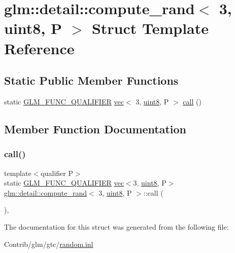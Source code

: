 \hypertarget{structglm_1_1detail_1_1compute__rand_3_013_00_01uint8_00_01_p_01_4}{}\section{glm\+:\+:detail\+:\+:compute\+\_\+rand$<$ 3, uint8, P $>$ Struct Template Reference}
\label{structglm_1_1detail_1_1compute__rand_3_013_00_01uint8_00_01_p_01_4}
\subsection*{Static Public Member Functions}
\begin{DoxyCompactItemize}
\item 
static \mbox{\hyperlink{setup_8hpp_a33fdea6f91c5f834105f7415e2a64407}{G\+L\+M\+\_\+\+F\+U\+N\+C\+\_\+\+Q\+U\+A\+L\+I\+F\+I\+ER}} \mbox{\hyperlink{structglm_1_1vec}{vec}}$<$ 3, \mbox{\hyperlink{namespaceglm_1_1detail_aef2588f97d090cc19fbbe0c74fe17c8f}{uint8}}, P $>$ \mbox{\hyperlink{structglm_1_1detail_1_1compute__rand_3_013_00_01uint8_00_01_p_01_4_a1c4fe17e05c4f573144b285f20675ec5}{call}} ()
\end{DoxyCompactItemize}


\subsection{Member Function Documentation}
\mbox{\label{structglm_1_1detail_1_1compute__rand_3_013_00_01uint8_00_01_p_01_4_a1c4fe17e05c4f573144b285f20675ec5}} 
\subsubsection{\texorpdfstring{call()}{call()}}
{\footnotesize\ttfamily template$<$qualifier P$>$ \\
static \mbox{\hyperlink{setup_8hpp_a33fdea6f91c5f834105f7415e2a64407}{G\+L\+M\+\_\+\+F\+U\+N\+C\+\_\+\+Q\+U\+A\+L\+I\+F\+I\+ER}} \mbox{\hyperlink{structglm_1_1vec}{vec}}$<$3, \mbox{\hyperlink{namespaceglm_1_1detail_aef2588f97d090cc19fbbe0c74fe17c8f}{uint8}}, P$>$ \mbox{\hyperlink{structglm_1_1detail_1_1compute__rand}{glm\+::detail\+::compute\+\_\+rand}}$<$ 3, \mbox{\hyperlink{namespaceglm_1_1detail_aef2588f97d090cc19fbbe0c74fe17c8f}{uint8}}, P $>$\+::call (\begin{DoxyParamCaption}{ }\end{DoxyParamCaption})\hspace{0.3cm}{\ttfamily [inline]}, {\ttfamily [static]}}



The documentation for this struct was generated from the following file\+:\begin{DoxyCompactItemize}
\item 
Contrib/glm/gtc/\mbox{\hyperlink{random_8inl}{random.\+inl}}\end{DoxyCompactItemize}
